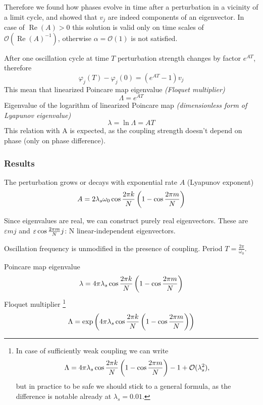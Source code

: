 \documentclass[a4paper,10pt]{article}
\renewcommand*{\Re}{\operatorname{Re}}
\newcommand*{\eps}{\varepsilon}
\newcommand*{\bigO}{\mathcal{O}}
\begin{document}
Therefore we found how phases evolve in time after a perturbation in a vicinity of a limit cycle, and showed that $v_j$ are indeed components of an eigenvector. 
In case of $\Re(A) > 0$ this solution is valid only on time scales of $\bigO(\Re(A)^{-1})$, otherwise $\alpha = \bigO(1)$ is not satisfied.

After one oscillation cycle at time $T$ perturbation strength changes by factor $e^{AT}$, therefore
\begin{equation}
\varphi_j(T) - \varphi_j(0) = (e^{AT} - 1) v_j
\end{equation}
This mean that linearized Poincare map eigenvalue \textit{(Floquet multiplier)}
$$
\Lambda = e^{A T}
$$
Eigenvalue of the logarithm of linearized Poincare map \textit{(dimensionless form of Lyapunov eigenvalue)}
$$
\lambda = \ln \Lambda = A T
$$
This relation with A is expected, as the coupling strength doesn't depend on phase (only on phase difference).

\subsubsection{Results}

The perturbation grows or decays with exponential rate $A$ (Lyapunov exponent)
$$
A = 2 \lambda_s \omega_0 \cos \frac{2 \pi k} {N}  \left(1 - \cos \frac{2 \pi m} {N}  \right)
$$

Since eigenvalues are real, we can construct purely real eigenvectors. These are $\eps \si{m}{j}$ and  $\eps \co{m}{j}$: N linear-independent eigenvectors.

Oscillation frequency is unmodified in the presence of coupling. Period $T = \frac{2 \pi}{\omega_0}$.


Poincare map eigenvalue
$$
\lambda = 4 \pi \lambda_s  \cos \frac{2 \pi k} {N}  \left(1 - \cos \frac{2 \pi m} {N}  \right)
$$
Floquet multiplier 
\footnote{
In case of sufficiently weak coupling we can write
$$
\Lambda 
= 4 \pi \lambda_s  \co{k}{} \left(1 - \co{m}{} \right) - 1  + \bigO(\lambda_s^2),
$$
but in practice to be safe we should stick to a general formula, as the difference is notable already at $\lambda_s = 0.01$.
}
$$
\Lambda = \exp \left( 4  \pi \lambda_s  \cos \frac{2 \pi k} {N}  \left(1 - \cos \frac{2 \pi m} {N}  \right) \right)
$$
\end{document}

